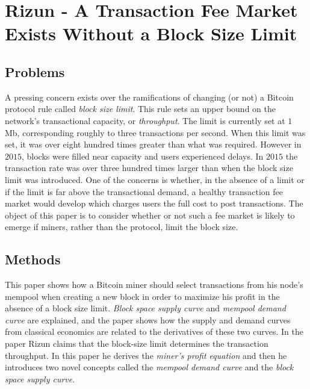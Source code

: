 \documentclass[USenglish]{uit-thesis}
\begin{document}
\section{Rizun - A Transaction Fee Market Exists Without a Block Size Limit}
\label{sec:rizun}
\subsection{Problems}
A pressing concern exists over the ramifications of changing (or not)
a Bitcoin protocol rule called \emph{block size limit}. This rule sets an
upper bound on the network's transactional capacity, or \emph{throughput}.
The limit is currently set at $1$\,Mb, corresponding roughly to three transactions
per second. When this limit was set, it was over eight hundred times
greater than what was required. However in $2015$, blocks
were filled near capacity and users experienced delays. In $2015$
the transaction rate was over three hundred times larger
than when the block size limit was introduced. One of the
concerns is whether, in the absence of a limit or if the limit
is far above the transactional demand, a healthy transaction
fee market would develop which charges users the full
cost to post transactions. The object
of this paper is to consider whether or not such a fee
market is likely to emerge if miners, rather than the protocol,
limit the block size.
\subsection{Methods}
This paper shows how a Bitcoin miner should
select transactions from his node's mempool
when creating a new block in order to maximize
his profit in the absence of a block size limit.
\emph{Block space supply curve} and
\emph{mempool demand curve} are explained, and the
paper shows how the supply and demand
curves from classical economics are related to the
derivatives of these two curves.
In the paper Rizun claims that the block-size limit determines the
transaction throughput. In this paper he derives
the \emph{miner's profit equation} and then
he introduces two novel concepts called
the \emph{mempool demand curve} and the
\emph{block space supply curve}.
\end{document}
